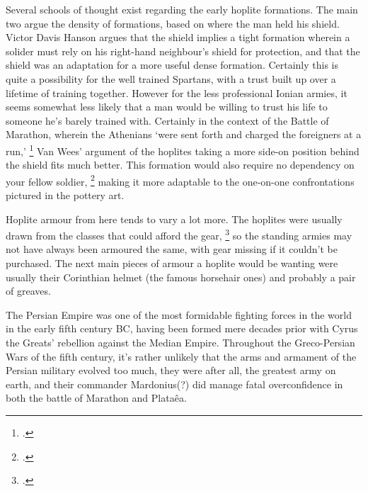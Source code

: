 \documentclass[twoside, a4paper, 12pt]{article}
\begin{document}
Several schools of thought exist regarding the early hoplite formations. The
main two argue the density of formations, based on where the man held his shield.
Victor Davis Hanson argues that the shield implies a tight formation wherein
a solider must rely on his right-hand neighbour's shield for protection, and
that the shield was an adaptation for a more useful dense formation.\footnotemark
{}
Certainly this is quite a possibility for the well trained Spartans, with a
trust built up over a lifetime of training together. However for the less
professional Ionian armies, it seems somewhat less likely that a man would be
willing to trust his life to someone he's barely trained with. Certainly
in the context of the Battle of Marathon, wherein the Athenians 
`were sent forth and charged the foreigners at a run,'
\footcite[Book 6.112]{herodotus_1920} Van Wees' argument of the hoplites taking
a more side-on position behind the shield fits much better.
This formation would also require no dependency on your
fellow soldier, \footcite[58]{wees_hoplite_bronze} making it more adaptable to
the one-on-one confrontations pictured in the pottery art.

\par\vspace{1em}

Hoplite armour from here tends to vary a lot more. The hoplites
were usually drawn from the classes that could afford the gear, \footcite[38]{wietzel_wheeler_1970}
so the standing armies may not have always been armoured the same, with gear
missing if it couldn't be purchased. The next main pieces of armour a hoplite
would be wanting were usually their Corinthian helmet (the famous horsehair
ones) and probably a pair of greaves.

\par\vspace{1em}

The Persian Empire was one of the most formidable fighting forces in the world
in the early fifth century BC, having been formed mere decades prior with
Cyrus the Greats' rebellion against the Median Empire. Throughout the
Greco-Persian Wars of the fifth century, it's rather unlikely that the arms
and armament of the Persian military evolved too much, they were after all,
the greatest army on earth, and their commander Mardonius(?) did manage
fatal overconfidence in both the battle of Marathon and Plata\^ea.

\par\vspace{1em}
\end{document}
